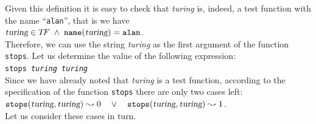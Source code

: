 Given this definition it is easy to check that \textsl{turing} is, indeed, a test function with the name
``\texttt{alan}'', that is we have 
\\[0.3cm]
\hspace*{1.3cm} 
$\textsl{turing} \in T\!F \;\wedge\; \mathtt{name}(\textsl{turing}) = \mathtt{alan}$. 
\\[0.2cm]
Therefore, we can use the string \textsl{turing} as the first argument of the function
\texttt{stops}.  Let us determine the value of the following expression:
\\[0.2cm]
\hspace*{1.3cm} 
\texttt{stops \textsl{turing} \textsl{turing}} 
\\[0.2cm]
Since we have already noted that \textsl{turing} is a test function, according to the specification of
the function \texttt{stops} there are only two cases left:
\\[0.2cm]
\hspace*{1.3cm} 
$\mathtt{stops}(\textsl{turing}, \textsl{turing}) \leadsto 0 \quad \vee\quad
 \mathtt{stops}(\textsl{turing}, \textsl{turing}) \leadsto 1$. 
\\[0.2cm]
Let us consider these cases in turn.
